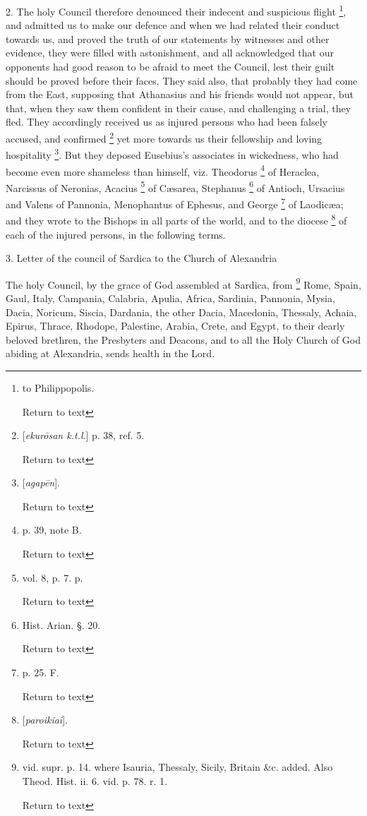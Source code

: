 2. The holy Council therefore denounced their
indecent and suspicious flight \footnote{to
Philippopolis.

Return to text}, and admitted us to make our
defence and when we had related their conduct towards us, and proved
the truth of our statements by witnesses and other evidence, they were
filled with astonishment, and all acknowledged that our opponents had
good reason to be afraid to meet the Council, lest their guilt should
be proved before their faces. They said also, that probably they had
come from the East, supposing that Athanasius and his friends would
not appear, but that, when they saw them confident in their cause, and
challenging a trial, they fled. They accordingly received us as
injured persons who had been falsely accused, and confirmed \footnote{[\emph{ekur\={o}san k.t.l}.] p. 38, ref. 5.

Return to text}
yet more towards us their fellowship and loving hospitality \footnote{[\emph{agap\={e}n}].

Return to text}.
But they deposed Eusebius's associates in wickedness, who had become
even more shameless than himself, viz. Theodorus \footnote{p. 39, note B.

Return to text} of Heraclea,
Narcissus of Neronias, Acacius \footnote{vol. 8, p. 7. p.

Return to text} of Cæsarea, Stephanus \footnote{Hist. Arian. §. 20.

Return to text} of Antioch, Ursacius and Valens of Pannonia, Menophantus of
Ephesus, and George \footnote{p. 25. F.

Return to text} of Laodicæa; and they wrote to the
Bishops in all parts of the world, and to the diocese \footnote{[\emph{paroikiai}].

Return to text} of
each of the injured persons, in the following terms.

3. Letter of the council of Sardica to the Church
of Alexandria

The holy Council, by the grace of God assembled
at Sardica, from \footnote{vid. supr. p. 14. where Isauria, Thessaly,
Sicily, Britain \&c. added. Also Theod. Hist. ii. 6. vid. p. 78. r.
1.

Return to text} Rome, Spain, Gaul, Italy, Campania,
Calabria, Apulia, Africa, Sardinia, Pannonia, Mysia, Dacia, Noricum,
Siscia, Dardania, the other Dacia, Macedonia, Thessaly, Achaia,
Epirus, Thrace, Rhodope, Palestine, Arabia, Crete, and Egypt, to
their dearly beloved brethren, the Presbyters and Deacons, and to all
the Holy Church of God abiding at Alexandria, sends health in the
Lord.

